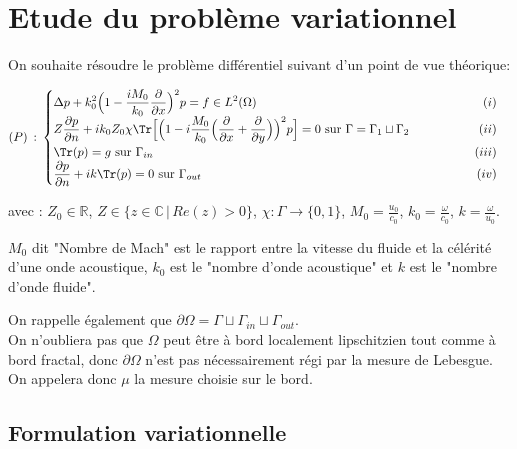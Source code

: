 \section{Etude du problème variationnel}
\begin{tcolorbox}[colback=blue!5!white,colframe=blue!75!black,title=Definition 4.0: Problème différentiel]
On souhaite résoudre le problème différentiel suivant d'un point de vue théorique:

\[
    (P) \hspace{2pt} : \hspace{2pt}
    \begin{cases}
    \displaystyle \Delta p + k_0^2\Big(1 - \frac{iM_0}{k_0}\frac{\partial}{\partial x}\Big)^2p = f \in L^2(\Omega) \hfill (i)\\
    \displaystyle Z\frac{\partial p}{\partial n} + ik_0Z_0\chi \Tr \Bigl[ \Bigl(1-i \frac{M_0}{k_0} \Big(\frac{\partial}{\partial x} + \frac{\partial}{\partial y}\Big) \Bigr)^2p \Bigr] = 0$ sur $\Gamma = \Gamma_1 \sqcup \Gamma_2 \hspace*{2cm} \hfill (ii)
    \\
    \displaystyle \Tr(p) = g $ sur $ \Gamma_{in} \hfill (iii) \\
    \displaystyle \frac{\partial p}{\partial n} + ik \Tr(p) = 0 $ sur $\Gamma_{out} \hfill (iv)
    \end{cases} 
\]

avec : $\displaystyle Z_0 \in \mathbb{R}$,  $Z \in \{z \in \mathbb{C} \hspace{2pt} | \hspace{2pt} Re(z) > 0\}$, $\chi : \Gamma \to \{0,1\} $, $\displaystyle M_0 = \frac{u_0}{c_0}$, $\displaystyle k_0 = \frac{\omega}{c_0}$, $\displaystyle k = \frac{\omega}{u_0}$.

$M_0$ dit "Nombre de Mach" est le rapport entre la vitesse du fluide et la célérité d'une onde acoustique, $k_0$ est le "nombre d'onde acoustique" et $k$ est le "nombre d'onde fluide".

On rappelle également que $\partial \Omega = \Gamma \sqcup \Gamma_{in} \sqcup \Gamma_{out}$. \\
On n'oubliera pas que $\Omega$ peut être à bord localement lipschitzien tout comme à bord fractal, donc  $\partial \Omega$ n'est pas nécessairement régi par la mesure de Lebesgue. On appelera donc $\mu$ la mesure choisie sur le bord.

\end{tcolorbox}

\subsection{Formulation variationnelle}

